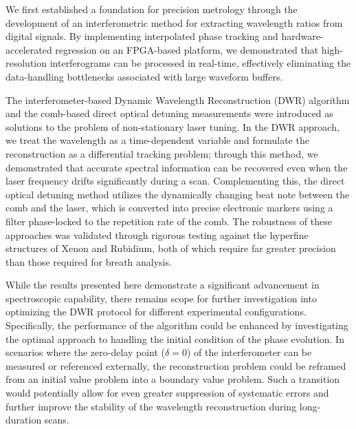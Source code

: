 \documentclass[8pt,a4paper]{report}
\begin{document}
	We first established a foundation for precision metrology through the development of an interferometric method for extracting wavelength ratios from digital signals. By implementing interpolated phase tracking and hardware-accelerated regression on an FPGA-based platform, we demonstrated that high-resolution interferograms can be processed in real-time, effectively eliminating the data-handling bottlenecks associated with large waveform buffers.
	
	The interferometer-based Dynamic Wavelength Reconstruction (DWR) algorithm and the comb-based direct optical detuning measurements were introduced as solutions to the problem of non-stationary laser tuning. In the DWR approach, we treat the wavelength as a time-dependent variable and formulate the reconstruction as a differential tracking problem; through this method, we demonstrated that accurate spectral information can be recovered even when the laser frequency drifts significantly during a scan. Complementing this, the direct optical detuning method utilizes the dynamically changing beat note between the comb and the laser, which is converted into precise electronic markers using a filter phase-locked to the repetition rate of the comb. The robustness of these approaches was validated through rigorous testing against the hyperfine structures of Xenon and Rubidium, both of which require far greater precision than those required for breath analysis.
	
	
	While the results presented here demonstrate a significant advancement in spectroscopic capability, there remains scope for further investigation into optimizing the DWR protocol for different experimental configurations. Specifically, the performance of the algorithm could be enhanced by investigating the optimal approach to handling the initial condition of the phase evolution. In scenarios where the zero-delay point ($\delta = 0$) of the interferometer can be measured or referenced externally, the reconstruction problem could be reframed from an initial value problem into a boundary value problem. Such a transition would potentially allow for even greater suppression of systematic errors and further improve the stability of the wavelength reconstruction during long-duration scans.
	
\end{document}
